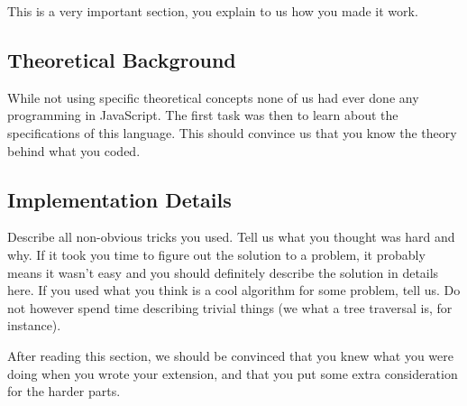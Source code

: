 This is a very important section, you explain to us how you made it work.

\subsection{Theoretical Background}
While not using specific theoretical concepts none of us had ever done any programming in JavaScript.
The first task was then to learn about the specifications of this language. This should convince us that you know the theory behind what
you coded. 

\subsection{Implementation Details}
Describe all non-obvious tricks you used. Tell us what you thought was hard and
why. If it took you time to figure out the solution to a problem, it probably
means it wasn't easy and you should definitely describe the solution in details
here. If you used what you think is a cool algorithm for some problem, tell us.
Do not however spend time describing trivial things (we what a tree traversal
is, for instance). 

After reading this section, we should be convinced that you knew what you were
doing when you wrote your extension, and that you put some extra consideration
for the harder parts.
